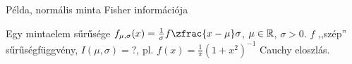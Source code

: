 \documentclass[aspectratio=169,notheorems,9pt,\option]{beamer}
\begin{document}
\begin{frame}{Példa, normális minta Fisher információja}
\begin{itemize}
    Egy mintaelem sűrűsége $f_{\mu,\sigma}(x)=\frac1\sigma f\zfrac{x-\mu}\sigma$, $\mu\in\mathbb{R}$, $\sigma>0$. 
    $f$ ,,szép'' sűrűségfüggvény,
    $I(\mu,\sigma)=?$, pl. $f(x)=\frac1{\pi}(1+x^2)^{-1}$ Cauchy eloszlás.


\end{itemize}
\end{frame}
\end{document}
